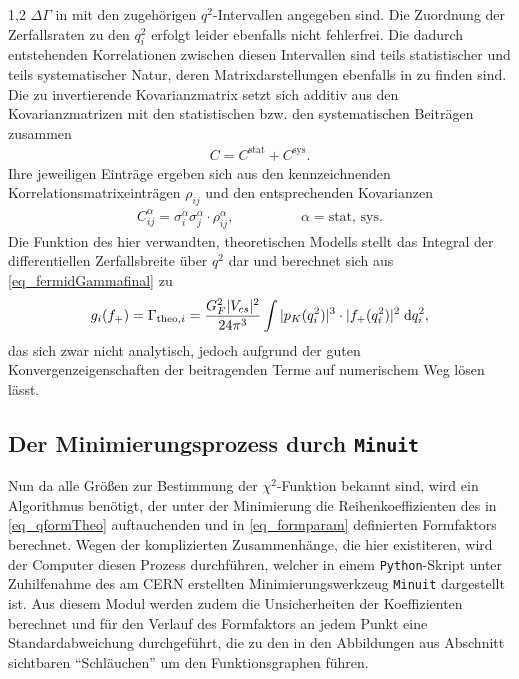 \documentclass[11pt,a4paper,twoside]{report}
\begin{document}
\begin{spacing}{1,2}
 $\Delta \Gamma$ in \cite{PhysRev_Data} mit den zugehörigen $q^2$-Intervallen angegeben sind. Die 
Zuordnung der Zerfallsraten zu den $q^2_i$ erfolgt leider ebenfalls nicht fehlerfrei. Die dadurch entstehenden Korrelationen zwischen diesen Intervallen 
sind teils statistischer und teils systematischer Natur, deren Matrixdarstellungen ebenfalls in \cite{PhysRev_Data} zu finden 
sind. Die zu invertierende Kovarianzmatrix setzt sich additiv aus den Kovarianzmatrizen mit den statistischen bzw. den systematischen Beiträgen zusammen
\begin{align}
 C = C^{\text{stat}} + C^{\text{sys}}.
\end{align}
Ihre jeweiligen Einträge ergeben sich aus den kennzeichnenden Korrelationsmatrixeinträgen $\rho_{ij}$ und den entsprechenden Kovarianzen
\begin{align}
 C^{\alpha}_{ij} = \sigma^{\alpha}_i \sigma^{\alpha}_j \cdot \rho^{\alpha}_{ij}, \hspace{2cm}\alpha = \text{stat, sys}.
\end{align}
Die Funktion des hier verwandten, theoretischen Modells stellt das Integral der differentiellen Zerfallsbreite über $q^2$ dar und berechnet sich aus 
\eqref{eq_fermidGammafinal} zu
\begin{align}
 g_i(f_+) = \Gamma_{\text{theo},i} = \frac{G_F^2 |V_{cs}|^2}{24\pi^3}\int|p_K(q_i^2)|^3 \cdot |f_+(q^2_i)|^2\; \mathrm{d} q_i^2,
 \label{eq_qformTheo}
\end{align}
das sich zwar nicht analytisch, jedoch aufgrund der guten Konvergenzeigenschaften der beitragenden Terme auf numerischem Weg lösen lässt. 

\subsection{Der Minimierungsprozess durch \texttt{Minuit}}
Nun da alle Größen zur Bestimmung der $\chi^2$-Funktion bekannt sind, wird ein Algorithmus benötigt, der unter der Minimierung die Reihenkoeffizienten
des in \eqref{eq_qformTheo} auftauchenden und in \eqref{eq_formparam} definierten Formfaktors berechnet. Wegen der komplizierten Zusammenhänge, die hier
existiteren, wird der Computer diesen Prozess durchführen, welcher in einem \texttt{Python}-Skript unter Zuhilfenahme des am CERN erstellten 
Minimierungswerkzeug \texttt{Minuit} \cite{Minuit} dargestellt ist. Aus diesem Modul werden zudem die Unsicherheiten der Koeffizienten berechnet und für den Verlauf
des Formfaktors an jedem Punkt eine Standardabweichung durchgeführt, die zu den in den Abbildungen aus Abschnitt \label{sec_results} sichtbaren ``Schläuchen''
um den Funktionsgraphen führen.


\end{spacing}
\end{document}
